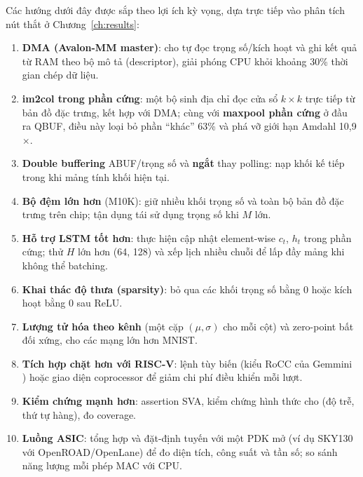 Các hướng dưới đây được sắp theo lợi ích kỳ vọng, dựa trực tiếp vào phân tích nút thắt ở Chương~\ref{ch:results}:
\begin{enumerate}
  \item \textbf{DMA (Avalon-MM master)}: cho \NPU{} tự đọc trọng số/kích hoạt và ghi kết quả từ RAM theo bộ mô tả (descriptor), giải phóng CPU khỏi khoảng 30\% thời gian chép dữ liệu.
  \item \textbf{im2col trong phần cứng}: một bộ sinh địa chỉ đọc cửa sổ $k\times k$ trực tiếp từ bản đồ đặc trưng, kết hợp với DMA; cùng với \textbf{maxpool phần cứng} ở đầu ra QBUF, điều này loại bỏ phần ``khác'' 63\% và phá vỡ giới hạn Amdahl 10,9$\times$.
  \item \textbf{Double buffering} ABUF/trọng số và \textbf{ngắt} thay polling: nạp khối kế tiếp trong khi mảng tính khối hiện tại.
  \item \textbf{Bộ đệm lớn hơn} (M10K): giữ nhiều khối trọng số và toàn bộ bản đồ đặc trưng trên chip; tận dụng tái sử dụng trọng số khi $M$ lớn.
  \item \textbf{Hỗ trợ LSTM tốt hơn}: thực hiện cập nhật element-wise $c_t$, $h_t$ trong phần cứng; thử $H$ lớn hơn (64, 128) và xếp lịch nhiều chuỗi để lấp đầy mảng khi không thể batching.
  \item \textbf{Khai thác độ thưa (sparsity)}: bỏ qua các khối trọng số bằng 0 hoặc kích hoạt bằng 0 sau ReLU.
  \item \textbf{Lượng tử hóa theo kênh} (một cặp $(\mu,\sigma)$ cho mỗi cột) và zero-point bất đối xứng, cho các mạng lớn hơn MNIST.
  \item \textbf{Tích hợp chặt hơn với RISC-V}: lệnh tùy biến (kiểu RoCC của Gemmini \cite{genc2021gemmini}) hoặc giao diện coprocessor để giảm chi phí điều khiển mỗi lượt.
  \item \textbf{Kiểm chứng mạnh hơn}: assertion SVA, kiểm chứng hình thức cho  (độ trễ, thứ tự hàng), đo coverage.
  \item \textbf{Luồng ASIC}: tổng hợp và đặt-định tuyến với một PDK mở (ví dụ SKY130 với OpenROAD/OpenLane) để đo diện tích, công suất và tần số; so sánh năng lượng mỗi phép MAC với CPU.
\end{enumerate}
